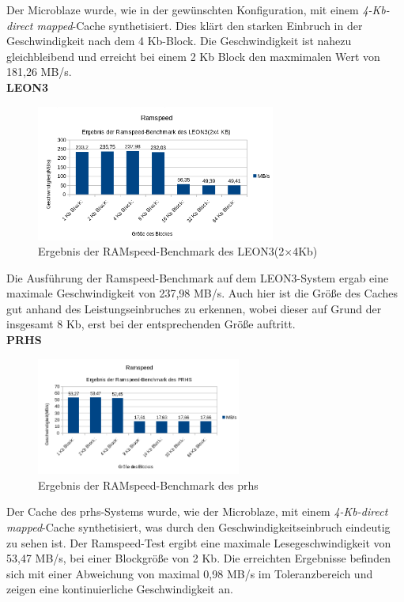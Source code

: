 Der Microblaze wurde, wie in der gewünschten Konfiguration, mit einem \emph{4-Kb-direct mapped}-Cache synthetisiert. Dies klärt den starken Einbruch in der Geschwindigkeit nach dem 4 Kb-Block.
Die Geschwindigkeit ist nahezu gleichbleibend und erreicht bei einem 2 Kb Block den maxmimalen Wert von 181,26 MB/s.\\

\textbf{LEON3}

\begin{figure}[H]
\centering
\includegraphics[width=0.7\textwidth]{Hauptteil/ramspeedleon3.png}
\caption{Ergebnis der RAMspeed-Benchmark des LEON3(2\(\times\)4Kb)}
\label{fig:ramspeedleon3}
\end{figure}

Die Ausführung der Ramspeed-Benchmark auf dem LEON3-System ergab eine maximale Geschwindigkeit von 237,98 MB/s. Auch hier ist die Größe des Caches gut anhand des Leistungseinbruches zu erkennen,
wobei dieser auf Grund der insgesamt 8 Kb, erst bei der entsprechenden Größe auftritt.\\

\textbf{PRHS}

\begin{figure}[H]
\centering
\includegraphics[width=0.6\textwidth]{Hauptteil/ramspeedprhs.png}
\caption{Ergebnis der RAMspeed-Benchmark des \ac{prhs}}
\label{fig:ramspeedprhs}
\end{figure}

Der Cache des \ac{prhs}-Systems wurde, wie der Microblaze, mit einem \emph{4-Kb-direct mapped}-Cache synthetisiert, was durch den Geschwindigkeitseinbruch eindeutig zu sehen ist. Der
Ramspeed-Test ergibt eine maximale Lesegeschwindigkeit von 53,47 MB/s, bei einer Blockgröße von 2 Kb. Die erreichten Ergebnisse befinden sich mit einer Abweichung von maximal 0,98 MB/s
im Toleranzbereich und zeigen eine kontinuierliche Geschwindigkeit an.\\

